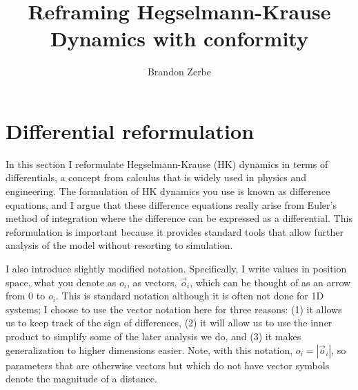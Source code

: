 \documentclass{article}
\title{Reframing Hegselmann-Krause Dynamics with conformity}
\author{Brandon Zerbe}
\begin{document}
\maketitle
\section{Differential reformulation}

In this section I reformulate Hegselmann-Krause (HK) dynamics in terms of differentials,
a concept from calculus that is widely used in physics and engineering.
The formulation of HK dynamics you use is known as difference equations, and I argue that these difference
equations really arise from Euler's method of integration where the difference can be
expressed as a differential.  This reformulation is important because it provides standard
tools that allow further analysis of the model without resorting to simulation.

I also introduce slightly modified notation.  Specifically, I write values in position space,
what you denote as $o_i$, as vectors, ${\vec{o}}_i$, which can be thought of as an arrow from $0$
to $o_i$.  This is standard notation although it is often not done for 1D systems; 
I choose to use the vector notation here 
for three reasons: (1) it allows us to keep track of the sign of
differences, (2) it will allow us to use the inner product to simplify some of the later analysis we do,
and (3) it makes generalization to higher dimensions easier.  Note, with this notation,
$o_i = |{\vec{o}}_i|$, so parameters that are otherwise vectors but which do not have vector symbols
denote the magnitude of a distance.
\end{document}
